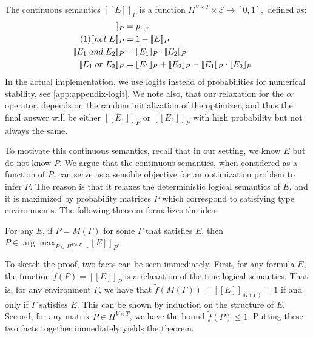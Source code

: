 \documentclass[sigplan,10pt,review,anonymous]{acmart} %
\newcommand{\qqpi}[2]{[\![#2]\!]_{#1}}
\newcommand\numberthis{\addtocounter{equation}{1}\tag{\theequation}}
\newcommand{\margincomment}[2]{\marginpar{\scriptsize\color{Maroon}#1 says: #2}}
\newcommand{\cas}[1]{\margincomment{Charles}{#1}}
\newcommand{\ivp}[1]{\margincomment{IVP}{#1}}
\theoremstyle{plain}
\theoremstyle{remark}
\theoremstyle{definition}
\begin{document}
The continuous semantics $\qqpi{P}{E}$ is a function $\Pi^{V \times T} \times \mathcal{E} \rightarrow [0, 1],$
defined as:
\begin{align*}
	\qqpi{P}{x_v \mathrel{is} l_\tau} & = p_{v,\tau}                        \\  \numberthis \label{eq:logical}
	\qqpi{P}{\mathrel{not} E}         & = 1-\qqpi{P}{E}                     \\
	\qqpi{P}{E_1 \mathrel{and} E_2}   & = \qqpi{P}{E_1} \cdot \qqpi{P}{E_2} \\
	\qqpi{P}{E_1 \mathrel{or} E_2}    & =
	\qqpi{P}{E_1} + \qqpi{P}{E_2} - \qqpi{P}{E_1}\cdot\qqpi{P}{E_2}
\end{align*}
In the actual implementation, we use logits instead of probabilities
for numerical stability, see \cref{app:appendix-logit}. We note also, that our relaxation for the $\mathrel{or}$ operator, depends on the random initialization of the optimizer, and thus the final answer will be 
either $\qqpi{P}{E_1}$ or $\qqpi{P}{E_2}$ with high probability but 
not always the same.

To motivate this continuous semantics, recall that in our setting, we know $E$ but
do not know $P$. We argue that the continuous semantics,
when considered as a function of $P$, can serve as a sensible
objective for an optimization problem to infer $P.$
The reason is that it relaxes
the deterministic logical semantics of $E$, and it is maximized
by probability matrices $P$ which correspond to satisfying type environments.
The following theorem formalizes the idea:
\begin{theorem}
	For any $E$, if $P = M(\Gamma)$ for some $\Gamma$ that satisfies $E$, then $P \in \arg\max_{P \in \Pi^{V \times T}} \qqpi{P}{E}$.
\end{theorem}

To sketch the proof, two facts can be seen immediately.
First, for any formula $E$, the function $\tilde{f}(P) = \qqpi{P}{E}$ is a relaxation
of the true logical semantics. That is, for any environment $\Gamma$, we have that
$\tilde{f}(M(\Gamma)) = \qqpi{M(\Gamma)}{E} = 1$ if and only if $\Gamma$ satisfies $E.$ This can be shown
by induction on the structure of $E$.
Second, for any matrix $P \in \Pi^{V \times T}$,
we have the bound $\tilde{f}(P) \leq 1$. Putting these two facts together
immediately yields the theorem.
\end{document}
